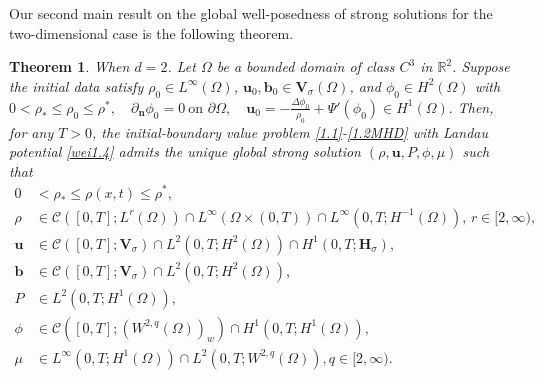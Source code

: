 \documentclass[11pt]{article}
\newtheorem{theorem}{Theorem}[section]
\numberwithin{equation}{section}
\begin{document}
Our second main result on  the global well-posedness of strong solutions for the two-dimensional case is the following theorem.
\begin{theorem}\label{1.3} When $d=2$. Let $\Omega$ be a bounded domain of class $C^3$ in $\mathbb{R}^2$.
	Suppose the initial data satisfy $\rho_0 \in L^{\infty}(\Omega)$,
	$\mathbf{u}_0, \mathbf{b}_0\in \mathbf{V}_{\sigma}(\Omega)$, and $\phi_0 \in H^2(\Omega)$ with
	$0<\rho_* \leq \rho_0 \leq \rho^*, \quad
	\partial_{\mathbf{n}} \phi_0 = 0 \ \text{on } \partial \Omega, \quad
	\mathbf{u}_0 = -\frac{\Delta \phi_0}{\rho_0} + \Psi'(\phi_0) \in H^1(\Omega).$
	Then,  for any $T>0$, the initial-boundary value problem
	\eqref{1.1}-\eqref{1.2MHD} with Landau potential \eqref{wei1.4} admits the  unique global  strong solution
	$(\rho, \mathbf{u}, P, \phi, \mu)$ such that
	\begin{align*}
0&<\rho_* \leq \rho(x, t) \leq \rho^*,\\
\rho &\in \mathcal{C}([0,T]; L^r(\Omega)) \cap L^\infty(\Omega \times (0,T)) \cap L^\infty(0,T; H^{-1}(\Omega)),\, r \in [2,\infty), \\
		\mathbf{u} &\in \mathcal{C}([0,T]; \mathbf{V}_\sigma) \cap L^2(0,T; H^2(\Omega)) \cap H^1(0,T; \mathbf{H}_\sigma), \\
\mathbf{b} &\in \mathcal{C}([0,T]; \mathbf{V}_{\sigma}) \cap L^2(0,T; H^2(\Omega)) , \\		P &\in L^2(0,T; H^1(\Omega)), \\
		\phi &\in \mathcal{C}([0,T]; (W^{2,q}(\Omega))_w) \cap H^1(0,T; H^1(\Omega)), \\
		\mu &\in L^\infty(0,T; H^1(\Omega)) \cap L^2(0,T; W^{2,q}(\Omega)), q \in [2,\infty).
	\end{align*}
\end{theorem}
\end{document}

